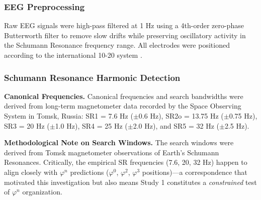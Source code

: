 \documentclass[11pt,a4paper]{article}
\newcommand{\phisym}{\varphi}
\begin{document}
\begin{table}[H]
\centering
\caption{Combined Dataset Characteristics}
\label{tab:dataset_summary}
\end{table}

\subsubsection{EEG Preprocessing}
Raw EEG signals were high-pass filtered at 1 Hz using a 4th-order zero-phase Butterworth filter \parencite{butterworth1930filter} to remove slow drifts while preserving oscillatory activity in the Schumann Resonance frequency range. All electrodes were positioned according to the international 10-20 system \parencite{jasper1958tentwenty}.

\subsubsection{Schumann Resonance Harmonic Detection}

\textbf{Canonical Frequencies.}
Canonical frequencies and search bandwidths were derived from long-term magnetometer data recorded by the Space Observing System in Tomsk, Russia: SR1 = 7.6 Hz ($\pm$0.6 Hz), SR2o = 13.75 Hz ($\pm$0.75 Hz), SR3 = 20 Hz ($\pm$1.0 Hz), SR4 = 25 Hz ($\pm$2.0 Hz), and SR5 = 32 Hz ($\pm$2.5 Hz).

\textbf{Methodological Note on Search Windows.}
The search windows were derived from Tomsk magnetometer observations of Earth's Schumann Resonances. Critically, the empirical SR frequencies (7.6, 20, 32 Hz) happen to align closely with $\phisym^n$ predictions ($\phisym^0$, $\phisym^2$, $\phisym^3$ positions)---a correspondence that motivated this investigation but also means Study 1 constitutes a \textit{constrained} test of $\phisym^n$ organization.
\end{document}
